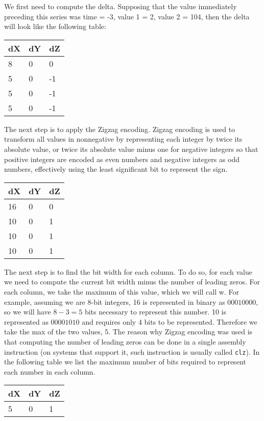 We first need to compute the delta. Supposing that the value immediately preceding
this series was time = -3, value 1 = 2, value 2 = 104, then the delta will look like the
following table:
\begin{table}[!htbp]
\centering
\begin{tabular}{l|l|l}
\textbf{dX} & \textbf{dY} & \textbf{dZ} \\ 
\hline
8 & 0 &  0 \\
5 & 0 & -1 \\
5 & 0 & -1 \\
5 & 0 & -1 \\
\end{tabular}
\end{table}
The next step is to apply the Zigzag encoding. Zigzag encoding is used to transform all
values in nonnegative by representing each integer by twice its absolute value, or twice
its absolute value minus one for negative integers so that positive integers are encoded
as even numbers and negative integers as odd numbers, effectively using the least significant
bit to represent the sign.
\begin{table}[!htbp]
\centering
\begin{tabular}{l|l|l}
\textbf{dX} & \textbf{dY} & \textbf{dZ} \\ 
\hline
16 & 0 &  0 \\
10 & 0 &  1 \\
10 & 0 &  1 \\
10 & 0 &  1 \\
\end{tabular}
\end{table}
The next step is to find the bit width for each column. To do so, for each value we need to
compute the current bit width minus the number of leading zeros. For each column, we take
the maximum of this value, which we will call w. For example, assuming we are 8-bit integers,
16 is represented in binary as $00010000$, so we will have $8 - 3 = 5$ bits necessary to represent
this number. 10 is represented as $00001010$ and requires only 4 bits to be represented.
Therefore we take the max of the two values, 5. The reason why Zigzag encoding was used is
that computing the number of leading zeros can be done in a single assembly instruction
(on systems that support it, such instruction is usually called \texttt{clz}). In the following table
we list the maximum number of bits required to represent each number in each column.
\begin{table}[!htbp]
\centering
\begin{tabular}{l|l|l}
\textbf{dX} & \textbf{dY} & \textbf{dZ} \\ 
\hline
5 & 0 & 1 \\
\end{tabular}
\end{table}

